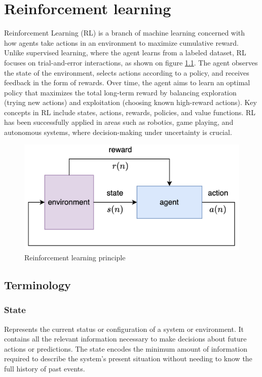 \documentclass[12pt,twoside,onecolumn,openany,extrafontsizes,dvipsnames]{memoir}
\begin{document}
\newpage
\chapter{Reinforcement learning}

    Reinforcement Learning (RL) is a branch of machine learning concerned with how agents take actions 
    in an environment to maximize cumulative reward. 
    Unlike supervised learning, where the agent learns from a labeled dataset, 
    RL focuses on trial-and-error interactions, as shown on figure \ref{fig:rl_principle}. 
    The agent observes the state of the environment, 
    selects actions according to a policy, and receives feedback in the form of rewards. 
    Over time, the agent aims to learn an optimal policy that maximizes the total long-term reward by balancing exploration (trying new actions) and exploitation (choosing known high-reward actions).
    Key concepts in RL include states, actions, rewards, policies, and value functions. 
    RL has been successfully applied in areas such as robotics, game playing, 
    and autonomous systems, where decision-making under uncertainty is crucial.

    \begin{figure}[!htb]
        \centering
        \includegraphics[scale=0.8]{../diagrams/reinforcement_learning/rl-rl.png}
        \caption{Reinforcement learning principle}
        \label{fig:rl_principle}
    \end{figure}

    \newpage
    \section{Terminology}

    \subsection{State}
    Represents the current status or configuration of a system or environment. 
    It contains all the relevant information necessary to make decisions about future actions or predictions. 
    The state encodes the minimum amount of information required to describe the system's present situation without needing to know the full history of past events.
\end{document}

